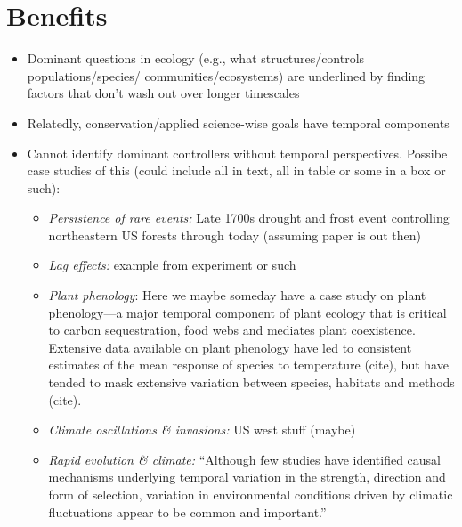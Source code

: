 \documentclass[11pt,a4paper]{article}
\newenvironment{smitemize}{
\begin{itemize}
  \setlength{\itemsep}{1pt}
  \setlength{\parskip}{0pt}
  \setlength{\parsep}{0pt}}
{\end{itemize}
}
\newcommand*\dashme{\item[--]}
\begin{document}
\section{Benefits}
\begin{smitemize}
\dashme Dominant questions in ecology (e.g., what structures/controls populations/species/ communities/ecosystems) are underlined by finding factors that don't wash out over longer timescales
\dashme Relatedly, conservation/applied science-wise goals have temporal components
\dashme Cannot identify dominant controllers without temporal perspectives. Possibe case studies of this (could include all in text, all in table or some in a box or such):
\begin{smitemize}
\dashme \emph{Persistence of rare events:} Late 1700s drought and frost event controlling northeastern US forests through today (assuming paper is out then)
\dashme \emph{Lag effects:} example from experiment or such
\dashme \emph{Plant phenology}: Here we maybe someday have a case study on plant phenology---a major temporal component of plant ecology that is critical to carbon sequestration, food webs and mediates plant coexistence. Extensive data available on plant phenology have led to consistent estimates of the mean response of species to temperature (cite), but have tended to mask extensive variation between species, habitats and methods (cite). 
\dashme \emph{Climate oscillations \& invasions:} US west stuff (maybe)
\dashme \emph{Rapid evolution \& climate:} ``Although few studies
have identified causal mechanisms underlying temporal variation in the strength,
direction and form of selection, variation in environmental conditions driven by climatic fluctuations appear to be common and important.'' \citep{Siepielski:2009ti}
\end{smitemize}
\end{smitemize}
\end{document}

